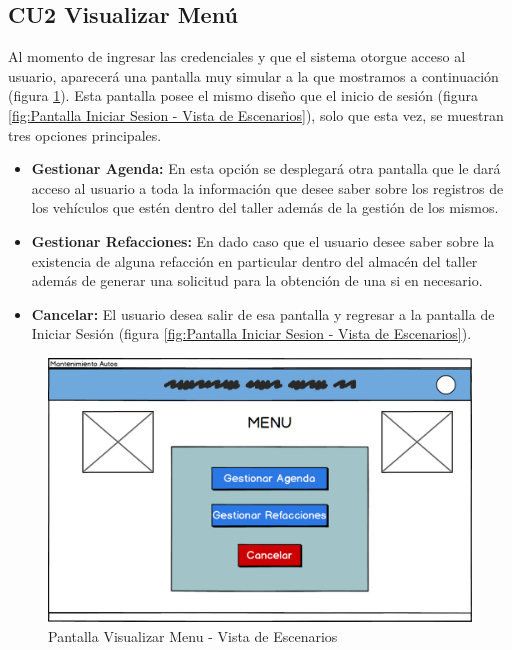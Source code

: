 \subsection{CU2 Visualizar Menú}
Al momento de ingresar las credenciales y que el sistema otorgue acceso al usuario, aparecerá una pantalla muy simular a la que mostramos a continuación (figura \ref{fig:Pantalla Visualizar Menu - Vista de Escenarios}). Esta pantalla posee el mismo diseño que el inicio de sesión (figura \ref{fig:Pantalla Iniciar Sesion - Vista de Escenarios}), solo que esta vez, se muestran tres opciones principales. 
\begin{itemize}
	\item \textbf{Gestionar Agenda:} En esta opción se desplegará otra pantalla que le dará acceso al usuario a toda la información que desee saber sobre los registros de los vehículos que estén dentro del taller además de la gestión de los mismos.
	\item \textbf{Gestionar Refacciones:} En dado caso que el usuario desee saber sobre la existencia de alguna refacción en particular dentro del almacén del taller además de generar una solicitud para la obtención de una si en necesario.
	\item \textbf{Cancelar:} El usuario desea salir de esa pantalla y regresar a la pantalla de Iniciar Sesión (figura \ref{fig:Pantalla Iniciar Sesion - Vista de Escenarios}).
\end{itemize}
\begin{figure}[!h]
	\centering
	\includegraphics[width=1\textwidth]{./diseno/vescenarios/imagenes/VisualizarMenu}
	\caption{Pantalla Visualizar Menu - Vista de Escenarios}
	\label{fig:Pantalla Visualizar Menu - Vista de Escenarios}
\end{figure}
\clearpage